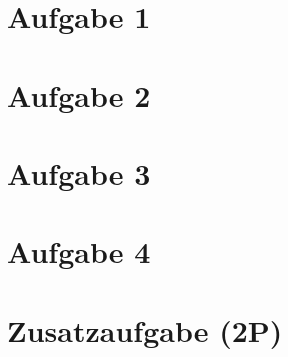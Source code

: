 \newcommand{\examdate}{13.02.2020}
\newcommand{\lecturer}{Andre Wachsmuth}
\newcommand{\modulecode}{3MI-MATHE-10}
\newcommand{\module}{Algebra/Analysis}
\newcommand{\submodule}{Analysis}
\newcommand{\termnumber}{1}
\newcommand{\allottedtime}{40 min}
\newcommand{\permittedtools}{1 handbeschriebenes A4-Blatt}
\newcommand{\scoretable}{
	\begin{tabularx}{\textwidth}{l|Y|Y|Y|Y|Y|Y}
		Aufgabe        & 1 & 2 & 3 & 4  & Zusatz & Summe \\ [1ex] \hline
		Soll-Punktzahl & 7 & 8 & 8 & 9  & 2 &            \\ [3ex]
		Ist-Punktzahl  &   &   &   &    &   &      ¸     \\ [3ex]
	\end{tabularx}
}




	


\newpage

\section* {Aufgabe 1}



\newpage

\section* {Aufgabe 2}



\newpage

\section* {Aufgabe 3}



\newpage

\section* {Aufgabe 4}



\newpage

\section*{Zusatzaufgabe (2P)}

